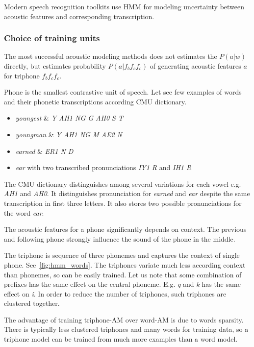 {Modern speech recognition toolkits use \acl{HMM}
for modeling uncertainty between acoustic features and corresponding transcription. 

\subsubsection*{Choice of training units}
The most successful acoustic modeling methods does not estimates the $P(a|w)$ directly,
but estimates probability $P(a|f_{b}f_{c}f_{c})$ of generating acoustic features $a$ for triphone $f_{b}f_{c}f_{c}$.

Phone is the smallest contrastive unit of speech. 
Let see few examples of words and their phonetic transcriptions according CMU dictionary\cite{weide1998cmu}.
\begin{itemize}
    \item {\it youngest} \& {\it  Y AH1 NG G AH0 S T }
    \item {\it youngman} \& {\it  Y AH1 NG M AE2 N }
    \item {\it earned} \& {\it ER1 N D}
    \item {\it ear}\/ with two transcribed pronunciations {\it IY1 R}\/ and {\it IH1 R}
\end{itemize}
The CMU dictionary distinguishes among several variations for each vowel e.g. {\it AH1}\/ and {\it AH0}.
It distinguishes pronunciation for {\it earned}\/ and {\it ear}\/
despite the same transcription in first three letters.
It also stores two possible pronunciations for the word {\it ear}.

The acoustic features for a phone significantly depends on context.
The previous and following phone strongly influence the sound of the phone in the middle.

The triphone is sequence of three phonemes and captures the context of single phone.
See~\ref{fig:hmm_words}.
The triphones variate much less according context than phonemes, so can be easily trained.
Let us note that some combination of prefixes has the same effect on the central phoneme.
E.g. {\it q}\/ and {\it k} has the same effect on {\it i}. %
In order to reduce the number of triphones, such triphones are clustered together.

The advantage of training triphone-\ac{AM} over word-\ac{AM} 
is due to words sparsity. 
There is typically less clustered triphones and many words for training data,
so a triphone model can be trained from much more examples than a word model. 

}
